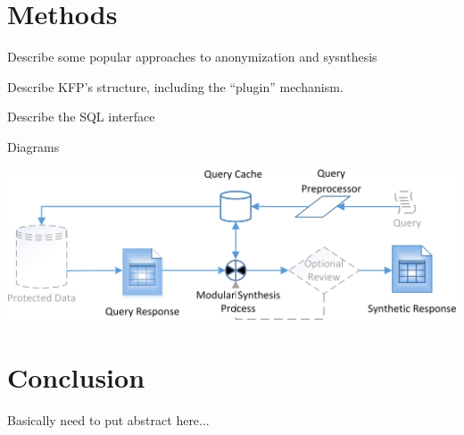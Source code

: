 \documentclass{article}
\begin{document}
\section{Methods}

Describe some popular approaches to anonymization and sysnthesis

Describe KFP's structure, including the ``plugin'' mechanism.

Describe the SQL interface

Diagrams

\includegraphics[width=\textwidth]{data_synthesis_process}


\section{Conclusion}

Basically need to put abstract here...




\end{document}
